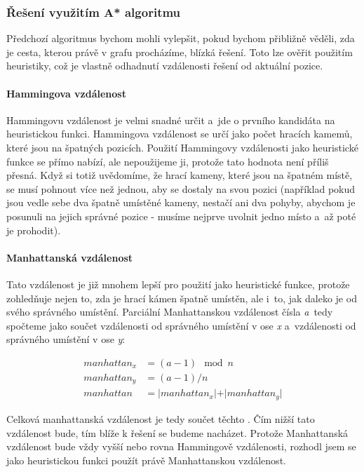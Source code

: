 \documentclass[12pt,titlepage]{article}
\begin{document}
\subsubsection{Řešení využitím A* algoritmu}
Předchozí algoritmus bychom mohli vylepšit, pokud bychom přibližně věděli, zda je cesta, kterou právě v grafu procházíme, blízká řešení. Toto lze ověřit použitím heuristiky, což je vlastně odhadnutí vzdálenosti řešení od aktuální pozice. 

\paragraph{Hammingova vzdálenost}
Hammingovu vzdálenost je velmi snadné určit a~jde o prvního kandidáta na heuristickou funkci. Hammingova vzdálenost se určí jako počet hracích kamemů, které jsou na špatných pozicích. Použití Hammingovy vzdálenosti jako heuristické funkce se přímo nabízí, ale nepoužijeme ji, protože tato hodnota není příliš přesná. Když si totiž uvědomíme, že hrací kameny, které jsou na špatném místě, se musí pohnout více než jednou, aby se dostaly na svou pozici (například pokud jsou vedle sebe dva špatně umístěné kameny, nestačí ani dva pohyby, abychom je posunuli na jejich správné pozice - musíme nejprve uvolnit jedno místo a~až poté je prohodit).

\paragraph{Manhattanská vzdálenost}
Tato vzdálenost je již mnohem lepší pro použití jako heuristické funkce, protože zohledňuje nejen to, zda je hrací kámen špatně umístěn, ale i~to, jak daleko je od svého správného umístění. Parciální Manhattanskou vzdálenost čísla \textit{a}~tedy spočteme jako součet vzdálenosti od správného umístění v ose \textit{x} a~vzdálenosti od správného umístění v ose \textit{y}:

\begin{align}
manhattan_x& = (a - 1)\mod n\\
manhattan_y& = (a - 1) / n\\
manhattan& = \vert manhattan_x \vert + \vert manhattan_y \vert
\end{align}

Celková manhattanská vzdálenost je tedy součet těchto . Čím nižší tato vzdálenost bude, tím blíže k řešení se budeme nacházet. Protože Manhattanská vzdálenost bude vždy vyšší nebo rovna Hammingově vzdálenosti, rozhodl jsem se jako heuristickou funkci použít právě Manhattanskou vzdálenost.
\end{document}
